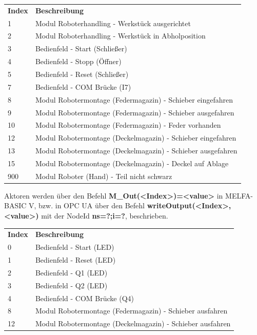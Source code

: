 \documentclass[11pt,a4paper,ngerman]{article}
\begin{document}
\begin{center}
	\setlength\extrarowheight{4pt}
	\small
	\begin{tabularx}{\textwidth}{|p{4cm}|X|}
		\hline
		\rowcolor{tublau}
		\multicolumn{2}{|c|}{\bf \color{white} \large Sensoren}\\
		\hline\hline
		\rowcolor{gray!80}
		\bf Index & \bf Beschreibung\\
		\hline\hline
		1 & Modul Roboterhandling - Werkstück ausgerichtet\\
		2 & Modul Roboterhandling - Werkstück in Abholposition\\
		3 & Bedienfeld - Start (Schließer)\\
		4 & Bedienfeld - Stopp (Öffner) \\
		5 & Bedienfeld - Reset (Schließer)\\
		7 & Bedienfeld - COM Brücke (I7)\\
		8 & Modul Robotermontage (Federmagazin) - Schieber eingefahren\\
		9 & Modul Robotermontage (Federmagazin) - Schieber ausgefahren\\
		10 & Modul Robotermontage (Federmagazin) - Feder vorhanden \\
		12 & Modul Robotermontage (Deckelmagazin) - Schieber eingefahren\\
		13 & Modul Robotermontage (Deckelmagazin) - Schieber ausgefahren\\
		15 & Modul Robotermontage (Deckelmagazin) - Deckel auf Ablage\\
		900 & Modul Roboter (Hand) - Teil nicht schwarz\\
		\hline
	\end{tabularx}
\end{center}
Aktoren werden über den Befehl \textbf{M\_Out(<Index>)=<value>} in MELFA-BASIC V, bzw. in OPC UA über den Befehl \textbf{writeOutput(<Index>,<value>)} mit der NodeId \textbf{ns=?;i=?}, beschrieben.
\begin{center}
	\setlength\extrarowheight{4pt}
	\small
	\begin{tabularx}{\textwidth}{|p{4cm}|X|}
		\hline
		\rowcolor{tublau}
		\multicolumn{2}{|c|}{\bf \color{white} \large Aktoren}\\
		\hline\hline
		\rowcolor{gray!80}
		\bf Index & \bf Beschreibung\\
		\hline\hline
		0 & Bedienfeld - Start (LED)\\
		1 & Bedienfeld - Reset (LED)\\
		2 & Bedienfeld - Q1 (LED)\\
		3 & Bedienfeld - Q2 (LED)\\
		4 & Bedienfeld - COM Brücke (Q4)\\
		8 & Modul Robotermontage (Federmagazin) - Schieber ausfahren\\
		12 & Modul Robotermontage (Deckelmagazin) - Schieber ausfahren\\
		\hline
	\end{tabularx}
\end{center}
\end{document}
